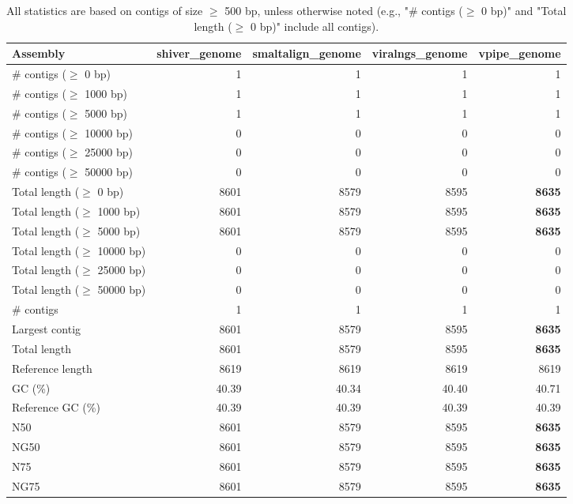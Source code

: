 \documentclass[12pt,a4paper]{article}
\begin{document}
\begin{table}[ht]
\begin{center}
\caption{All statistics are based on contigs of size $\geq$ 500 bp, unless otherwise noted (e.g., "\# contigs ($\geq$ 0 bp)" and "Total length ($\geq$ 0 bp)" include all contigs).}
\begin{tabular}{|l*{4}{|r}|}
\hline
Assembly & shiver\_genome & smaltalign\_genome & viralngs\_genome & vpipe\_genome \\ \hline
\# contigs ($\geq$ 0 bp) & 1 & 1 & 1 & 1 \\ \hline
\# contigs ($\geq$ 1000 bp) & 1 & 1 & 1 & 1 \\ \hline
\# contigs ($\geq$ 5000 bp) & 1 & 1 & 1 & 1 \\ \hline
\# contigs ($\geq$ 10000 bp) & 0 & 0 & 0 & 0 \\ \hline
\# contigs ($\geq$ 25000 bp) & 0 & 0 & 0 & 0 \\ \hline
\# contigs ($\geq$ 50000 bp) & 0 & 0 & 0 & 0 \\ \hline
Total length ($\geq$ 0 bp) & 8601 & 8579 & 8595 & {\bf 8635} \\ \hline
Total length ($\geq$ 1000 bp) & 8601 & 8579 & 8595 & {\bf 8635} \\ \hline
Total length ($\geq$ 5000 bp) & 8601 & 8579 & 8595 & {\bf 8635} \\ \hline
Total length ($\geq$ 10000 bp) & 0 & 0 & 0 & 0 \\ \hline
Total length ($\geq$ 25000 bp) & 0 & 0 & 0 & 0 \\ \hline
Total length ($\geq$ 50000 bp) & 0 & 0 & 0 & 0 \\ \hline
\# contigs & 1 & 1 & 1 & 1 \\ \hline
Largest contig & 8601 & 8579 & 8595 & {\bf 8635} \\ \hline
Total length & 8601 & 8579 & 8595 & {\bf 8635} \\ \hline
Reference length & 8619 & 8619 & 8619 & 8619 \\ \hline
GC (\%) & 40.39 & 40.34 & 40.40 & 40.71 \\ \hline
Reference GC (\%) & 40.39 & 40.39 & 40.39 & 40.39 \\ \hline
N50 & 8601 & 8579 & 8595 & {\bf 8635} \\ \hline
NG50 & 8601 & 8579 & 8595 & {\bf 8635} \\ \hline
N75 & 8601 & 8579 & 8595 & {\bf 8635} \\ \hline
NG75 & 8601 & 8579 & 8595 & {\bf 8635} \\ \hline

\end{tabular}
\end{center}
\end{table}
\end{document}
